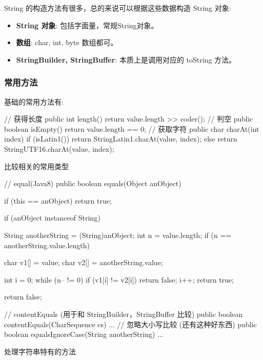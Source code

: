 String 的构造方法有很多，总的来说可以根据这些数据构造 String 对象:
\begin{itemize}
    \item \textbf{String 对象}: 包括字面量，常规String对象。
    \item \textbf{数组}: char, int, byte 数组都可。
    \item \textbf{StringBuilder, StringBuffer}: 本质上是调用对应的 toString 方法。
\end{itemize}

\subsubsection{常用方法}

基础的常用方法有:
\begin{Java}
// 获得长度
public int length() {
    return value.length >> coder();
}
// 判空
public boolean isEmpty() {
    return value.length == 0;
}
// 获取字符
public char charAt(int index) {
    if (isLatin1())
        return StringLatin1.charAt(value, index);
    else
        return StringUTF16.charAt(value, index);
}
\end{Java}

比较相关的常用类型
\begin{Java}
// equal(Java8)
public boolean equals(Object anObject) {
    if (this == anObject)
        return true;
    
    if (anObject instanceof String) {
        String anotherString = (String)anObject;
        int n = value.length;
        if (n == anotherString.value.length) {
            char v1[] = value;
            char v2[] = anotherString.value;

            int i = 0;
            while (n-- != 0) {
                if (v1[i] != v2[i])
                    return false;
                i++;
            }
            return true;
        }
    }
    return false;
}
// contentEquals (用于和 StringBuilder，StringBuffer 比较)
public boolean contentEquals(CharSequence cs) { ... }
// 忽略大小写比较 (还有这种好东西)
public boolean equalsIgnoreCase(String anotherString) { ... }
\end{Java}

处理字符串特有的方法

